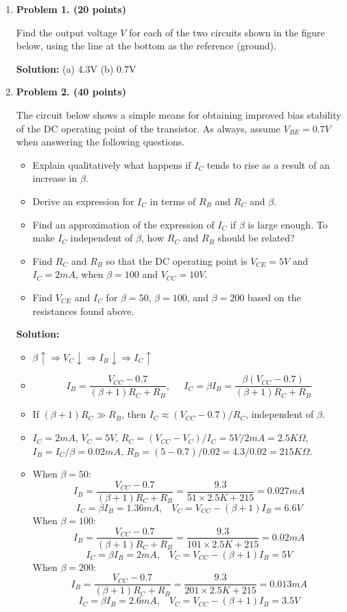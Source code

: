 \begin{enumerate}

\item {\bf Problem 1. (20 points)} 

Find the output voltage $V$ for each of the two circuits shown in the 
figure below, using the line at the bottom as the reference (ground).


{\bf Solution:} (a) 4.3V (b) 0.7V

\item {\bf Problem 2. (40 points)} 

The circuit below shows a simple means for obtaining improved bias
stability of the DC operating point of the transistor. As always,
assume $V_{BE}=0.7V$ when answering the following questions.


\begin{itemize}
\item Explain qualitatively what happens if $I_C$ tends to rise as a
result of an increase in $\beta$.
\item Derive an expression for $I_C$ in terms of $R_B$ and $R_C$ and
$\beta$.
\item Find an approximation of the expression of $I_C$ if $\beta$ is 
large enough. To make $I_C$ independent of $\beta$, how $R_C$ and
$R_B$ should be related?
\item Find $R_C$ and $R_B$ so that the DC operating point is $V_{CE}=5V$ 
and $I_C=2mA$, when $\beta=100$ and $V_{CC}=10V$.
\item Find $V_{CE}$ and $I_C$ for $\beta=50$, $\beta=100$, and $\beta=200$
	based on the resistances found above.
\end{itemize}

{\bf Solution:} 

\begin{itemize}
\item $\beta \uparrow \Longrightarrow V_C \downarrow \Longrightarrow 
	I_B \downarrow \Longrightarrow I_C \uparrow $
\item
\[ I_B=\frac{V_{CC}-0.7}{(\beta+1)R_C+R_B},\;\;\;\;\;
   I_C=\beta I_B=\frac{\beta(V_{CC}-0.7)}{(\beta+1)R_C+R_B}  \]
\item If $(\beta+1)R_C \gg R_B$, then $I_C \approx (V_{CC}-0.7)/R_C$, 
independent of $\beta$.
\item $I_C=2mA$, $V_C=5V$, $R_C=(V_{CC}-V_C)/I_C=5V/2mA=2.5K\Omega$,
$I_B=I_C/\beta=0.02mA$, $R_B=(5-0.7)/0.02=4.3/0.02=215K\Omega$.
\item 
When $\beta=50$:
\[	I_B=\frac{V_{CC}-0.7}{(\beta+1)R_C+R_B}=\frac{9.3}{51\times 2.5K+215}
	=0.027mA \]
\[ 	I_C=\beta I_B=1.36mA,\;\;\;V_C=V_{CC}-(\beta+1)I_B=6.6V \]
When $\beta=100$:
\[	I_B=\frac{V_{CC}-0.7}{(\beta+1)R_C+R_B}=\frac{9.3}{101\times 2.5K+215}
	=0.02mA \]
\[ 	I_C=\beta I_B=2 mA,\;\;\;V_C=V_{CC}-(\beta+1)I_B=5V \]
When $\beta=200$:
\[	I_B=\frac{V_{CC}-0.7}{(\beta+1)R_C+R_B}=\frac{9.3}{201\times 2.5K+215}
	=0.013mA \]
\[ 	I_C=\beta I_B=2.6mA,\;\;\;V_C=V_{CC}-(\beta+1)I_B=3.5V \]
\end{itemize}


\end{enumerate}
